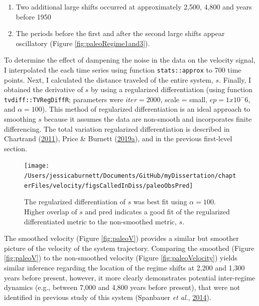 \documentclass[12pt,twoside,openany]{reedthesis}
\providecommand{\tightlist}{%
  \setlength{\itemsep}{0pt}\setlength{\parskip}{0pt}}
\begin{document}
\begin{enumerate}
\def\labelenumi{\arabic{enumi}.}
\tightlist
\item
  Two additional large shifts occurred at approximately 2,500, 4,800 and years before 1950\\
\item
  The periods before the first and after the second large shifts appear oscillatory (Figure \ref{fig:paleoRegime1and3}).
\end{enumerate}
To determine the effect of dampening the noise in the data on the velocity signal, I interpolated the each time series using function \texttt{stats::approx} to 700 time points. Next, I calculated the distance traveled of the entire system, \(s\). Finally, I obtained the derivative of \(s\) by using a regularized differentiation (using function \texttt{tvdiff::TVRegDiffR}; parameters were \(iter = 2000\), scale = small, \(ep = 1 x 10^-6\), and \(\alpha = 100\)). This method of regularized differentiation is an ideal approach to smoothing \(s\) because it assumes the data are non-smooth and incorporates finite differencing. The total variation regularized differentiation is described in Chartrand (\protect\hyperlink{ref-chartrand2011numerical}{2011}), Price \& Burnett (\protect\hyperlink{ref-price2019tvdiff}{2019}\protect\hyperlink{ref-price2019tvdiff}{a}), and in the previous first-level section.
\begin{figure}[bth]

{\centering \texttt{[image: /Users/jessicaburnett/Documents/GitHub/myDissertation/chapterFiles/velocity/figsCalledInDiss/paleoObsPred]} 

}

\caption{The regularized differentiation of $s$ was best fit using $\alpha = 100$. Higher overlap of $s$ and pred indicates a good fit of the regularized differentiated metric to the non-smoothed metric, $s$.}\label{fig:paleoObsPred}
\end{figure}
The smoothed velocity (Figure \ref{fig:paleoV}) provides a similar but smoother picture of the velocity of the system trajectory. Comparing the smoothed (Figure \ref{fig:paleoV}) to the non-smoothed velocity (Figure \ref{fig:paleoVelocity}) yields similar inference regarding the location of the regime shifts at 2,200 and 1,300 years before present, however, it more clearly demonstrates potential inter-regime dynamics (e.g., between 7,000 and 4,800 years before present), that were not identified in previous study of this system (Spanbauer \emph{et al.}, \protect\hyperlink{ref-spanbauer_prolonged_2014}{2014}).
\end{document}
